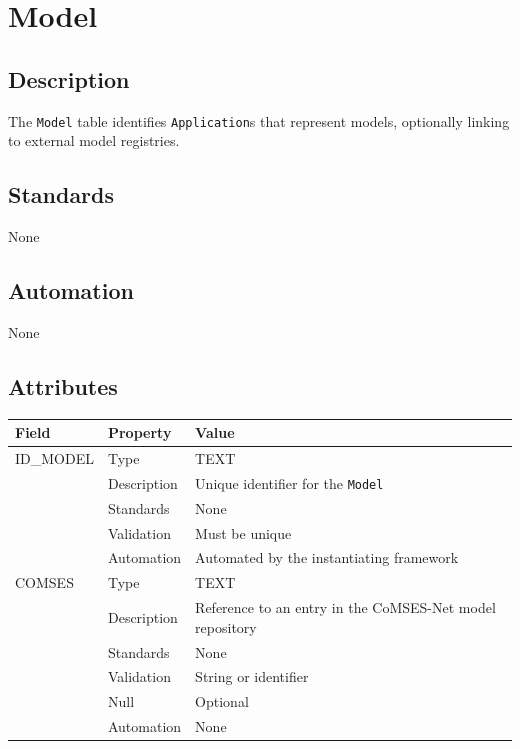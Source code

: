 \documentclass[
]{article}
\newcounter{none} %
\begin{document}
\section{Model}\label{model}

\subsection{Description}\label{description-18}

The \texttt{Model} table identifies \texttt{Application}s that represent
models, optionally linking to external model registries.

\subsection{Standards}\label{standards-20}

None

\subsection{Automation}\label{automation-20}

None

\subsection{Attributes}\label{attributes-17}

{\def\LTcaptype{none} %
\begin{longtable}[]{@{}
  >{\raggedright\arraybackslash}p{}
  >{\raggedright\arraybackslash}p{}
  >{\raggedright\arraybackslash}p{}@{}}
\toprule\noalign{}
\begin{minipage}[b]{\linewidth}\raggedright
Field
\end{minipage} & \begin{minipage}[b]{\linewidth}\raggedright
Property
\end{minipage} & \begin{minipage}[b]{\linewidth}\raggedright
Value
\end{minipage} \\
\midrule\noalign{}
\endhead
\bottomrule\noalign{}
\endlastfoot
ID\_MODEL & Type & TEXT \\
& Description & Unique identifier for the \texttt{Model} \\
& Standards & None \\
& Validation & Must be unique \\
& Automation & Automated by the instantiating framework \\
COMSES & Type & TEXT \\
& Description & Reference to an entry in the CoMSES-Net model
repository \\
& Standards & None \\
& Validation & String or identifier \\
& Null & Optional \\
& Automation & None \\
\end{longtable}
}
\end{document}
